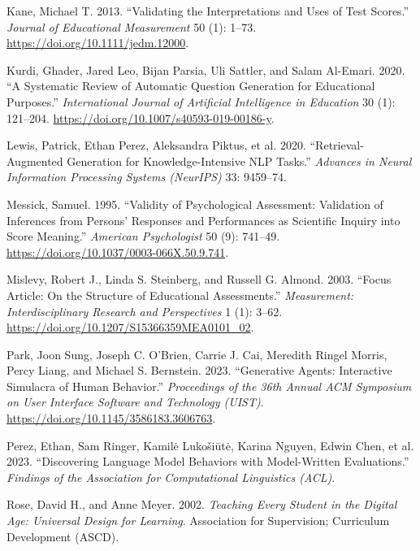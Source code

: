\documentclass[
  11pt,
  letterpaper,
]{article}
\newlength{\cslhangindent}
\newenvironment{CSLReferences}[2] %
 {\begin{list}{}{%
  \setlength{\itemindent}{0pt}
  \setlength{\leftmargin}{0pt}
  \setlength{\parsep}{0pt}
  \ifodd #1
   \setlength{\leftmargin}{\cslhangindent}
   \setlength{\itemindent}{-1\cslhangindent}
  \fi
  \setlength{\itemsep}{#2\baselineskip}}}
 {\end{list}}
\begin{document}
\begin{CSLReferences}{1}{1}
Kane, Michael T. 2013. {``Validating the Interpretations and Uses of
Test Scores.''} \emph{Journal of Educational Measurement} 50 (1): 1--73.
\url{https://doi.org/10.1111/jedm.12000}.

Kurdi, Ghader, Jared Leo, Bijan Parsia, Uli Sattler, and Salam Al-Emari.
2020. {``A Systematic Review of Automatic Question Generation for
Educational Purposes.''} \emph{International Journal of Artificial
Intelligence in Education} 30 (1): 121--204.
\url{https://doi.org/10.1007/s40593-019-00186-y}.

Lewis, Patrick, Ethan Perez, Aleksandra Piktus, et al. 2020.
{``Retrieval-Augmented Generation for Knowledge-Intensive {NLP}
Tasks.''} \emph{Advances in Neural Information Processing Systems
(NeurIPS)} 33: 9459--74.

Messick, Samuel. 1995. {``Validity of Psychological Assessment:
Validation of Inferences from Persons' Responses and Performances as
Scientific Inquiry into Score Meaning.''} \emph{American Psychologist}
50 (9): 741--49. \url{https://doi.org/10.1037/0003-066X.50.9.741}.

Mislevy, Robert J., Linda S. Steinberg, and Russell G. Almond. 2003.
{``Focus Article: On the Structure of Educational Assessments.''}
\emph{Measurement: Interdisciplinary Research and Perspectives} 1 (1):
3--62. \url{https://doi.org/10.1207/S15366359MEA0101_02}.

Park, Joon Sung, Joseph C. O'Brien, Carrie J. Cai, Meredith Ringel
Morris, Percy Liang, and Michael S. Bernstein. 2023. {``Generative
Agents: Interactive Simulacra of Human Behavior.''} \emph{Proceedings of
the 36th Annual ACM Symposium on User Interface Software and Technology
(UIST)}. \url{https://doi.org/10.1145/3586183.3606763}.

{Perez, Ethan, Sam Ringer, Kamilė Lukošiūtė, Karina Nguyen, Edwin Chen,
et al.} 2023. {``Discovering Language Model Behaviors with Model-Written
Evaluations.''} \emph{Findings of the Association for Computational
Linguistics (ACL)}.

Rose, David H., and Anne Meyer. 2002. \emph{Teaching Every Student in
the Digital Age: Universal Design for Learning}. Association for
Supervision; Curriculum Development (ASCD).


\end{CSLReferences}
\end{document}
